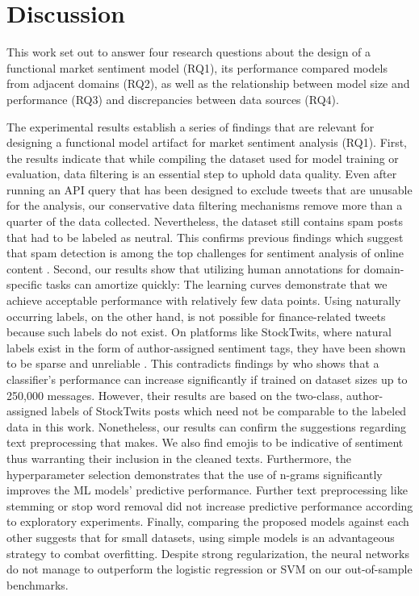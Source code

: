 \section{Discussion}

This work set out to answer four research questions about the design of a functional market sentiment model (RQ1), its performance compared models from adjacent domains (RQ2), as well as the relationship between model size and performance (RQ3) and discrepancies between data sources (RQ4).

The experimental results establish a series of findings that are relevant for designing a functional model artifact for market sentiment analysis (RQ1). First, the results indicate that while compiling the dataset used for model training or evaluation, data filtering is an essential step to uphold data quality. Even after running an API query that has been designed to exclude tweets that are unusable for the analysis, our conservative data filtering mechanisms remove more than a quarter of the data collected. Nevertheless, the dataset still contains spam posts that had to be labeled as neutral. This confirms previous findings which suggest that spam detection is among the top challenges for sentiment analysis of online content . Second, our results show that utilizing human annotations for domain-specific tasks can amortize quickly: The learning curves demonstrate that we achieve acceptable performance with relatively few data points. Using naturally occurring labels, on the other hand, is not possible for finance-related tweets because such labels do not exist. On platforms like StockTwits, where natural labels exist in the form of author-assigned sentiment tags, they have been shown to be sparse and unreliable . This contradicts findings by  who shows that a classifier's performance can increase significantly if trained on dataset sizes up to 250,000 messages. However, their results are based on the two-class, author-assigned labels of StockTwits posts which need not be comparable to the labeled data in this work. Nonetheless, our results can confirm the suggestions regarding text preprocessing that  makes. We also find emojis to be indicative of sentiment thus warranting their inclusion in the cleaned texts. Furthermore, the hyperparameter selection demonstrates that the use of n-grams significantly improves the ML models' predictive performance. Further text preprocessing like stemming or stop word removal did not increase predictive performance according to exploratory experiments. Finally, comparing the proposed models against each other suggests that for small datasets, using simple models is an advantageous strategy to combat overfitting. Despite strong regularization, the neural networks do not manage to outperform the logistic regression or SVM on our out-of-sample benchmarks.

